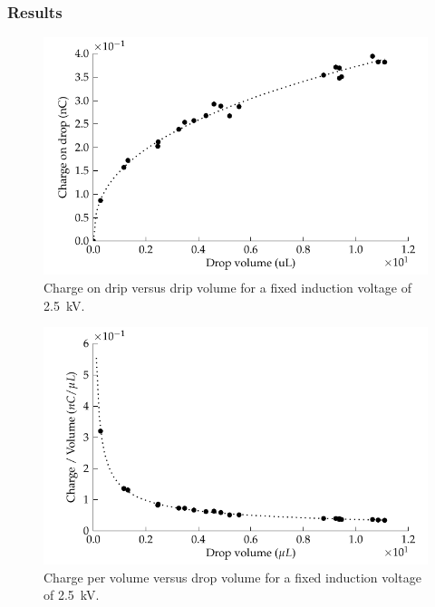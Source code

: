   \subsubsection*{Results}
    
    \begin{figure}
        \centering
        \includegraphics{content/appendices/chargedWaterDrops/graphics/dripper_chargeVsVolume}
        \caption{\label{Graph_dripperExperiment_chargeVsVolume}Charge on drip versus drip volume for a fixed induction voltage of \SI{2.5}{\kilo\volt}.}
    \end{figure}
    \begin{figure}
        \centering
        \includegraphics{content/appendices/chargedWaterDrops/graphics/dripper_chargePerVolumeVsVolume}
        \caption{\label{Figure_Graph_dripper_chargePerVolumeVsVolume}Charge per volume
        versus drop volume for a fixed induction voltage of \SI{2.5}{\kilo\volt}.}
    \end{figure}
